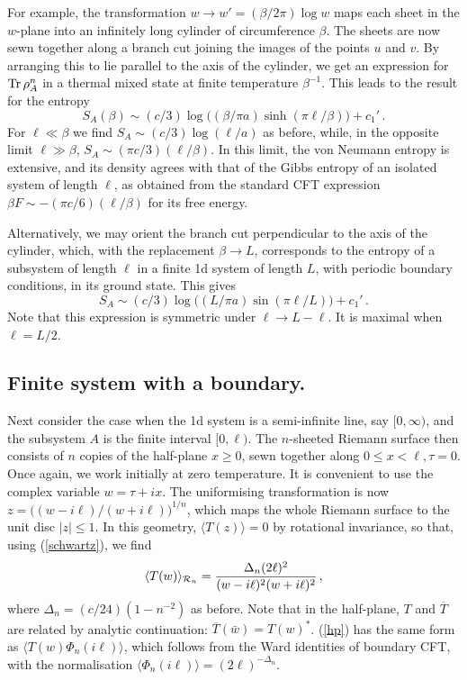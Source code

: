 \documentclass[preprint,aps]{revtex4}
\begin{document}
For example,
the transformation $w\to w'=(\beta/2\pi)\log w$ maps each sheet in
the $w$-plane into an infinitely long cylinder of circumference $\beta$.
The sheets are now sewn together along a branch cut joining the images
of the points $u$ and $v$. By arranging this to lie parallel to the axis
of the cylinder, we get an expression for ${\rm Tr}\,\rho_{A}^n$
in a thermal mixed state at finite temperature $\beta^{-1}$.
This leads to the result for the entropy
\begin{equation}
S_A(\beta)\sim(c/3)\log\big((\beta/\pi a)\sinh(\pi\ell/\beta)\big)+c_1'\,.
\end{equation}
For $\ell\ll\beta$ we find $S_A\sim(c/3)\log(\ell/a)$ as before, while, in the
opposite limit $\ell\gg\beta$, $S_A\sim(\pi c/3)(\ell/\beta)$. In this
limit, the von Neumann entropy is extensive, and its density agrees with
that of the Gibbs entropy of an isolated system of length $\ell$,
as obtained from the standard CFT expression\cite{BCN,Affleck}
$\beta F\sim -(\pi c/6)(\ell/\beta)$ for its free energy.

Alternatively, we may orient the branch cut perpendicular to the axis
of the cylinder, which, with the replacement $\beta\to L$, corresponds
to the entropy of a subsystem of length $\ell$ in a finite 1d system of
length $L$, with periodic boundary conditions, in its ground state.
This gives
\begin{equation}
S_A\sim (c/3)\log\big((L/\pi a)\sin(\pi\ell/L)\big)+c_1'\,.
\end{equation}
Note that this expression is symmetric under $\ell\to L-\ell$. It is
maximal when $\ell=L/2$.

\subsection{Finite system with a boundary.}
Next consider the case when the 1d system is a semi-infinite line,
say $[0,\infty)$, and the subsystem $A$ is the finite interval
$[0,\ell)$. The $n$-sheeted Riemann surface then consists of $n$ copies
of the half-plane $x\geq0$, sewn together along $0\leq x<\ell, \tau=0$.
Once again, we work initially at zero temperature. It is convenient
to use the complex variable $w=\tau+ix$. The uniformising transformation
is now $z=\big((w-i\ell)/(w+i\ell)\big)^{1/n}$, which maps the whole
Riemann surface to the unit disc $|z|\leq1$. In this geometry,
$\langle T(z)\rangle=0$ by rotational invariance, so that, using
(\ref{schwartz}), we find
\begin{equation}
\label{hp}
\langle T(w)\rangle_{{\cal R}_n}=
{\Delta_n(2\ell)^2\over(w-i\ell)^2(w+i\ell)^2}\,,
\end{equation}
where $\Delta_n=(c/24)(1-n^{-2})$ as before.
Note that in the half-plane, $T$ and $\overline T$ are related by
analytic continuation: $\overline T(\bar w)=T(w)^*$.
(\ref{hp}) has the same form as $\langle T(w)\Phi_n(i\ell)\rangle$,
which follows from the Ward identities of boundary CFT\cite{JCbound}, with the
normalisation $\langle\Phi_n(i\ell)\rangle=(2\ell)^{-\Delta_n}$.
\end{document}

